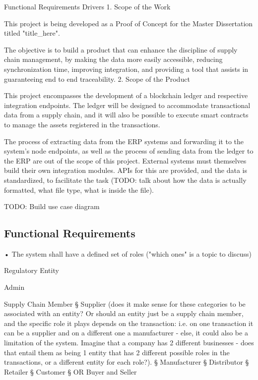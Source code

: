Functional Requirements Drivers
	1. Scope of the Work
		\par This project is being developed as a Proof of Concept for the Master Dissertation titled "title\_here".
		\par The objective is to build a product that can enhance the discipline of supply chain management, by making the data more easily accessible, reducing synchronization time, improving integration, and providing a tool that assists in guaranteeing end to end traceability.
	2. Scope of the Product
		\par This project encompasses the development of a blockchain ledger and respective integration endpoints. The ledger will be designed to accommodate transactional data from a supply chain, and it will also be possible to execute smart contracts to manage the assets registered in the transactions.
		\par The process of extracting data from the ERP systems and forwarding it to the system's node endpoints, as well as the process of sending data from the ledger to the ERP are out of the scope of this project. External systems must themselves build their own integration modules. APIs for this are provided, and the data is standardized, to facilitate the task (TODO: talk about how the data is actually formatted, what file type, what is inside the file).
		\par TODO: Build use case diagram
	
\subsection{Functional  Requirements}
	• The system shall have a defined set of roles ("which ones" is a topic to discuss)
		\par Regulatory Entity
		\par Admin
		\par Supply Chain Member
			§ Supplier  (does it make sense for these categories to be associated with an entity? Or should an entity just be a supply chain member, and the specific role it plays depends on the transaction: i.e. on one transaction it can be a supplier and on a different one a manufacturer - else, it could also be a limitation of the system. Imagine that a company has 2 different businesses - does that entail them as being 1 entity that has 2 different possible roles in the transactions, or a different entity for each role?).
			§ Manufacturer
			§ Distributor
			§ Retailer
			§ Customer
			§ OR  Buyer and Seller
		
